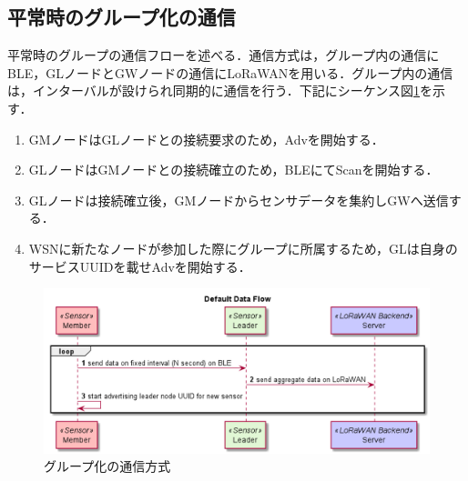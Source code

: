 \subsection{平常時のグループ化の通信}
平常時のグループの通信フローを述べる．通信方式は，グループ内の通信にBLE，GLノードとGWノードの通信にLoRaWANを用いる．グループ内の通信は，インターバルが設けられ同期的に通信を行う．下記にシーケンス図\ref{fig:default_data_flow}を示す．

\begin{enumerate}
    \item GMノードはGLノードとの接続要求のため，Advを開始する．
    \item GLノードはGMノードとの接続確立のため，BLEにてScanを開始する．
    \item GLノードは接続確立後，GMノードからセンサデータを集約しGWへ送信する．
    \item WSNに新たなノードが参加した際にグループに所属するため，GLは自身のサービスUUIDを載せAdvを開始する．
\end{enumerate}

\begin{figure}[]
    \begin{center}
    \includegraphics[width=13cm]{figures/グループ化の通信方式.png}
    \caption{グループ化の通信方式}
    \label{fig:default_data_flow}
    \end{center}
\end{figure}